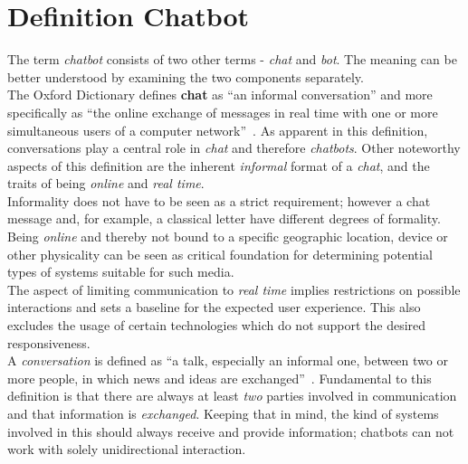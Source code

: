 \section{Definition Chatbot}
\label{defchatbot}


The term \emph{chatbot} consists of two other terms - \emph{chat} and \emph{bot}.
The meaning can be better understood by examining the two components separately.
\\

The Oxford Dictionary defines \textbf{chat} as ``an informal conversation'' and more specifically as ``the online exchange of messages in real time with one or more simultaneous users of a computer network''~\cite{oxfordchat}.
As apparent in this definition, conversations play a central role in \emph{chat} and therefore \emph{chatbots}.
Other noteworthy aspects of this definition are the inherent \emph{informal} format of a \emph{chat},
and the traits of being \emph{online} and \emph{real time}.
\\
Informality does not have to be seen as a strict requirement; however a chat message and, for example, a classical letter have different degrees of formality.
\\
Being \emph{online} and thereby not bound to a specific geographic location, device or other physicality can be seen as critical foundation for determining potential types of systems suitable for such media.
\\
The aspect of limiting communication to \emph{real time} implies restrictions on possible interactions and sets a baseline for the expected user experience.
This also excludes the usage of certain technologies which do not support the desired responsiveness.
\\

A \emph{conversation} is defined as ``a talk, especially an informal one, between two or more people, in which news and ideas are exchanged''~\cite{oxfordconversation}.
Fundamental to this definition is that there are always at least \emph{two} parties involved in communication and that information is \emph{exchanged}.
Keeping that in mind, the kind of systems involved in this should always receive and provide information;
chatbots can not work with solely unidirectional interaction.
\\

